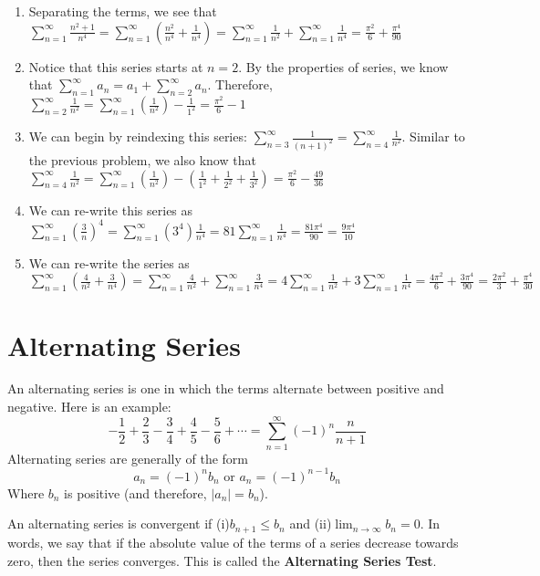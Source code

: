 \begin{Answer}[ref = euler1]
\begin{enumerate}
\item Separating the terms, we see that $\sum_{n=1}^\infty \frac{n^2 + 1}{n^4} 
= \sum_{n=1}^\infty \left( \frac{n^2}{n^4} + \frac{1}{n^4} \right) = \sum_{n=1}
^\infty \frac{1}{n^2} + \sum_{n=1}^\infty \frac{1}{n^4} = \frac{\pi^2}{6} + 
\frac{\pi^4}{90}$
\item Notice that this series starts at $n = 2$. By the properties of series, 
we know that $\sum_{n=1}^\infty a_n = a_1 + \sum_{n=2}^\infty a_n$. Therefore, 
$\sum_{n=2}^\infty \frac{1}{n^2} = \sum_{n=1}^\infty \left( \frac{1}{n^2} 
\right) - \frac{1}{1^2} = \frac{\pi^2}{6} - 1$
\item We can begin by reindexing this series: $\sum_{n=3}^\infty \frac{1}{(n + 
1)^2} = \sum_{n=4}^\infty \frac{1}{n^2}$. Similar to the previous problem, we 
also know that $\sum_{n=4}^\infty \frac{1}{n^2} = \sum_{n=1}^\infty \left( 
\frac{1}{n^2} \right) - \left( \frac{1}{1^2} + \frac{1}{2^2} + \frac{1}{3^2} 
\right) = \frac{\pi^2}{6} - \frac{49}{36}$
\item We can re-write this series as $\sum_{n=1}^\infty \left( \frac{3}{n} 
\right)^4 = \sum_{n=1}^\infty (3^4)\frac{1}{n^4} = 81 \sum_{n=1}^\infty 
\frac{1}{n^4} = \frac{81\pi^4}{90} = \frac{9\pi^4}{10}$
\item We can re-write the series as $\sum_{n=1}^\infty \left( \frac{4}{n^2} + 
\frac{3}{n^4} \right) = \sum_{n=1}^\infty \frac{4}{n^2} + \sum_{n=1}^\infty 
\frac{3}{n^4} = 4 \sum_{n=1}^\infty \frac{1}{n^2} + 3 \sum_{n=1}^\infty 
\frac{1}{n^4} = \frac{4\pi^2}{6} + \frac{3\pi^4}{90} = \frac{2\pi^2}{3} + 
\frac{\pi^4}{30}$
\end{enumerate}
\end{Answer}

\section{Alternating Series}
An alternating series is one in which the terms alternate between positive and 
negative. Here is an example:
$$-\frac{1}{2} + \frac{2}{3} - \frac{3}{4} + \frac{4}{5} - \frac{5}{6} + 
\cdots = \sum_{n=1}^\infty (-1)^n \frac{n}{n + 1}$$
Alternating series are generally of the form
$$a_n = (-1)^n b_n \text{ or } a_n = (-1)^{n - 1} b_n$$
Where $b_n$ is positive (and therefore, $|a_n| = b_n$).

An alternating series is convergent if (i)$b_{n+1} \leq b_n$ and (ii)$\lim_{n 
\to \infty} b_n = 0$. In words, we say that if the absolute value of the terms 
of a series decrease towards zero, then the series converges. This is called 
the \textbf{Alternating Series Test}.

